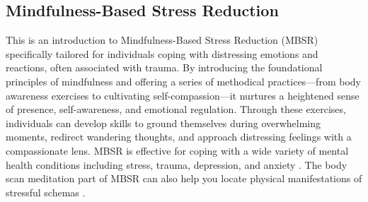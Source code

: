 \documentclass[12pt,letterpaper]{book}
\begin{document}
\subsection{Mindfulness-Based Stress Reduction}
\label{MBSR}
This is an introduction to Mindfulness-Based Stress Reduction (MBSR) specifically tailored for individuals coping with distressing emotions and reactions, often associated with trauma. By introducing the foundational principles of mindfulness and offering a series of methodical practices—from body awareness exercises to cultivating self-compassion—it nurtures a heightened sense of presence, self-awareness, and emotional regulation. Through these exercises, individuals can develop skills to ground themselves during overwhelming moments, redirect wandering thoughts, and approach distressing feelings with a compassionate lens. MBSR is effective for coping with a wide variety of mental health conditions including stress, trauma, depression, and anxiety \cite{liuMBSR,khouryMBSR}. The body scan meditation part of MBSR can also help you locate physical manifestations of stressful schemas \cite{vanderKolkBody}. 
\end{document}
